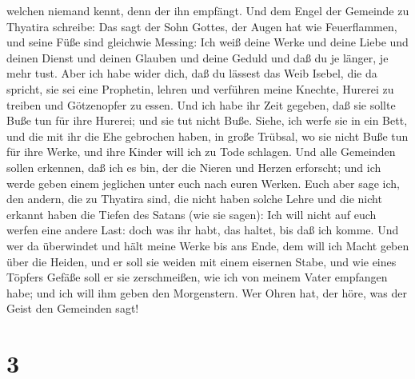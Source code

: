 welchen niemand kennt, denn der ihn empfängt.  Und dem
Engel der Gemeinde zu Thyatira schreibe: Das sagt der Sohn Gottes, der
Augen hat wie Feuerflammen, und seine Füße sind gleichwie Messing:
 Ich weiß deine Werke und deine Liebe und deinen Dienst und
deinen Glauben und deine Geduld und daß du je länger, je mehr tust.
 Aber ich habe wider dich, daß du lässest das Weib Isebel,
die da spricht, sie sei eine Prophetin, lehren und verführen meine
Knechte, Hurerei zu treiben und Götzenopfer zu essen.  Und
ich habe ihr Zeit gegeben, daß sie sollte Buße tun für ihre Hurerei; und
sie tut nicht Buße.  Siehe, ich werfe sie in ein Bett, und
die mit ihr die Ehe gebrochen haben, in große Trübsal, wo sie nicht Buße
tun für ihre Werke,  und ihre Kinder will ich zu Tode
schlagen. Und alle Gemeinden sollen erkennen, daß ich es bin, der die
Nieren und Herzen erforscht; und ich werde geben einem jeglichen unter
euch nach euren Werken.  Euch aber sage ich, den andern,
die zu Thyatira sind, die nicht haben solche Lehre und die nicht erkannt
haben die Tiefen des Satans (wie sie sagen): Ich will nicht auf euch
werfen eine andere Last:  doch was ihr habt, das haltet,
bis daß ich komme.  Und wer da überwindet und hält meine
Werke bis ans Ende, dem will ich Macht geben über die Heiden,
 und er soll sie weiden mit einem eisernen Stabe, und wie
eines Töpfers Gefäße soll er sie zerschmeißen,  wie ich von
meinem Vater empfangen habe; und ich will ihm geben den Morgenstern.
 Wer Ohren hat, der höre, was der Geist den Gemeinden sagt!

\hypertarget{section-2}{%
\section{3}\label{section-2}}


